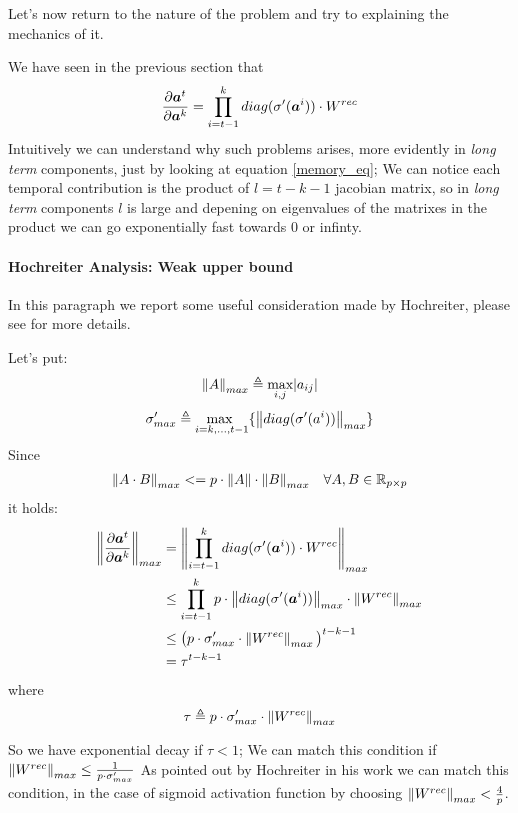 Let's now return to the nature of the problem and try to explaining the mechanics of it.

We have seen in the previous section that
\begin{equation}
\frac{\partial \boldsymbol{a}^t}{\partial \boldsymbol{a}^k} = \prod_{i=t-1}^{k}  diag(\sigma'(\boldsymbol{a}^i)) \cdot W^{rec}
\label{memory_eq}
\end{equation}
Intuitively we can understand why such problems arises, more evidently in \textit{long term} components, just by looking at equation \ref{memory_eq};
We can notice each temporal contribution is the product of $l=t-k-1$ jacobian matrix, so in \textit{long term} components $l$ is large and depening on
eigenvalues of the matrixes in the product we can go exponentially fast towards 0 or infinty.

\paragraph{Hochreiter Analysis: Weak upper bound}
In this paragraph we report some useful consideration made by Hochreiter, please see \cite{Hochreiter95longshort-term} for more details.

Let's put:
$$\left\Vert A \right\Vert_{max}\triangleq \underset{i,j}{\text{max}}|a_{ij}| $$
$$\sigma'_{max} \triangleq \underset{i=k,...,t-1}{\text{max  }} \{\left\Vert diag(\sigma'(a^i)) \right\Vert_{max}\}$$
Since
\begin{align}
\left\Vert A\cdot B \right\Vert_{max} &<= p \cdot \left\Vert A \right\Vert\cdot \left\Vert B \right\Vert_{max} & \forall A,B \in \mathbb{R}_{p\times p} 
\end{align}
it holds:
\begin{align}
\left\Vert \frac{\partial \boldsymbol{a}^t}{\partial \boldsymbol{a}^k} \right\Vert_{max} &= \left\Vert  \prod_{i=t-1}^{k}  diag(\sigma'(\boldsymbol{a}^i)) \cdot W^{rec}  \right\Vert_{max}\\
&\leq \prod_{i=t-1}^{k} p \cdot \left\Vert diag(\sigma'(\boldsymbol{a}^i)) \right\Vert_{max} \cdot \left\Vert W^{rec} \right\Vert_{max}\\
&\leq \big(p \cdot \sigma'_{max} \cdot \left\Vert W^{rec} \right\Vert_{max}\big)^{t-k-1} \\
&= \tau^{t-k-1}
\end{align}
where $$\tau \triangleq p \cdot \sigma'_{max} \cdot \left\Vert W^{rec} \right\Vert_{max}$$

So we have exponential decay if $\tau<1$; We can match this condition if $\left\Vert W^{rec} \right\Vert_{max} \leq \frac{1}{p\cdot \sigma'_{max}}$
As pointed out by Hochreiter in his work we can match this condition, in the case of sigmoid activation function by choosing $\left\Vert W^{rec} \right\Vert_{max} < \frac{4}{p}$.

